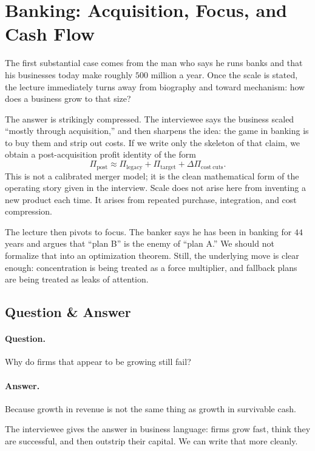 \section{Banking: Acquisition, Focus, and Cash Flow}

The first substantial case comes from the man who says he runs banks and that his businesses today make roughly \(500\) million a year. Once the scale is stated, the lecture immediately turns away from biography and toward mechanism: how does a business grow to that size?

The answer is strikingly compressed. The interviewee says the business scaled ``mostly through acquisition,'' and then sharpens the idea: the game in banking is to buy them and strip out costs. If we write only the skeleton of that claim, we obtain a post-acquisition profit identity of the form
\begin{equation}
\Pi_{\mathrm{post}} \approx \Pi_{\mathrm{legacy}} + \Pi_{\mathrm{target}} + \Delta \Pi_{\mathrm{cost\ cuts}}.
\end{equation}
This is not a calibrated merger model; it is the clean mathematical form of the operating story given in the interview. Scale does not arise here from inventing a new product each time. It arises from repeated purchase, integration, and cost compression.

The lecture then pivots to focus. The banker says he has been in banking for \(44\) years and argues that ``plan B'' is the enemy of ``plan A.'' We should not formalize that into an optimization theorem. Still, the underlying move is clear enough: concentration is being treated as a force multiplier, and fallback plans are being treated as leaks of attention.

\subsection{Question \& Answer}

\paragraph{Question.} Why do firms that appear to be growing still fail?

\paragraph{Answer.} Because growth in revenue is not the same thing as growth in survivable cash.

The interviewee gives the answer in business language: firms grow fast, think they are successful, and then outstrip their capital. We can write that more cleanly.

